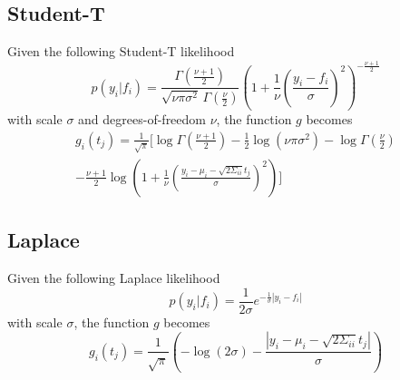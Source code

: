 \documentclass[5p,11pt]{article}
\begin{document}
\subsection{Student-T}
Given the following Student-T likelihood
$$ p(y_i|f_i) = \frac{\Gamma(\frac{\nu+1}{2})}{\sqrt{\nu\pi\sigma^2}\,\Gamma(\frac{\nu}{2})}\left(1+\frac{1}{\nu}\left(\frac{y_i-f_i}{\sigma}\right)^2\right)^{-\frac{\nu+1}{2}} $$
with scale $\sigma$ and degrees-of-freedom $\nu$, the function $g$ becomes
\begin{equation}
    \begin{aligned}
    g_i(t_j) = \frac{1}{\sqrt{\pi}} \Bigg[ \log \Gamma\left(\frac{\nu+1}{2}\right) - \frac{1}{2} \log(\nu\pi\sigma^2) - \log \Gamma\left(\frac{\nu}{2}\right) \\
- \frac{\nu+1}{2}\log\left( 1+\frac{1}{\nu}\left(\frac{y_i-\mu_i-\sqrt{2\Sigma_{ii}}t_j}{\sigma}\right)^2 \right) \Bigg] 
    \end{aligned}
\end{equation}

\subsection{Laplace}
Given the following Laplace likelihood
$$ p(y_i|f_i) = \frac{1}{2\sigma}e^{-\frac{1}{\sigma}|y_i-f_i|} $$
with scale $\sigma$, the function $g$ becomes
$$ g_i(t_j) = \frac{1}{\sqrt{\pi}} \left( -\log(2\sigma) - \frac{|y_i-\mu_i-\sqrt{2\Sigma_{ii}}t_j|}{\sigma} \right) $$
\end{document}
